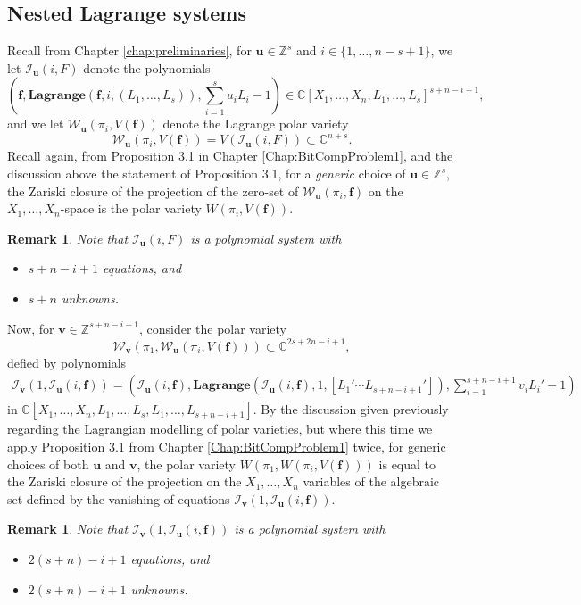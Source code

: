 \documentclass[12pt]{article}
\def\ub{{\bm u}}
\def\C{\mathbb{C}}
\def\lag{{\bm{Lagrange}}}
\newtheorem{remark}[theorem]{Remark}
\def\ub{{\bm u}}
\def\C{\mathbb{C}}
\def\Iil{\mathscr{I}_{\ub}(i,F)}
\begin{document}
\subsection{Nested Lagrange systems}\label{sec:nestedPolarVs}
Recall from Chapter \ref{chap:preliminaries}, for $\bm u \in \mathbb{Z}^s$ and $i \in \{1,\hdots,n-s+1\}$, we let $\Iil$ denote the polynomials 
\[
\left( \bm f, \lag(\bm f,i,(L_1,\hdots,L_s)), \sum_{i=1}^s u_iL_i-1\right) \in \mathbb{C}[X_1,\hdots,X_n,L_1,\hdots,L_s]^{s+n-i+1},
\]
and we let $\mathscr{W}_{\bm u}(\pi_i,V(\bm f))$ denote the Lagrange polar variety
\[
\mathscr{W}_{\bm u}(\pi_i,V(\bm f)) = V(\Iil)\subset \C^{n+s}.
\]
Recall again, from Proposition 3.1 in Chapter \ref{Chap:BitCompProblem1}, and the discussion above the statement of Proposition 3.1, for a {\em
  generic} choice of $\bm u\in \mathbb{Z}^s$, the Zariski closure of the projection of
the zero-set of $\mathscr{W}_{\bm u}(\pi_i, \bm f)$ on the $X_1,\dots,X_n$-space is the polar variety
$W(\pi_i,V(\bm f))$.
\begin{remark}
    Note that $\Iil$ is a polynomial system with
    \begin{itemize}
        \item $s+n-i+1$ equations, and
        \item $s+n$ unknowns. 
    \end{itemize}
\end{remark}
%
\noindent 
Now, for $\bm v \in \mathbb{Z}^{s+n-i+1}$, consider the polar variety \[\mathscr{W}_{\bm v}(\pi_1,\mathscr{W}_{\bm u}(\pi_i,V(\bm f))) \subset \C^{2s+2n-i+1},\]
defied by polynomials 
\begin{align*}
\mathscr{I}_{\bm v}(1,\mathscr{I}_{\bm u}(i,\bm f)) = \left(\mathscr{I}_{\bm u}(i,\bm f),\lag(\mathscr{I}_{\bm u}(i,\bm f),1,[L_1'\cdots L_{s+n-i+1}']),\sum_{i=1}^{s+n-i+1}v_iL_i' -1\right) 
\end{align*}
in 
$\C[X_1,\hdots,X_n,L_1,\hdots,L_s,L_1,\hdots,L_{s+n-i+1}]$. 
%
By the discussion given previously regarding the Lagrangian modelling of polar varieties, but where this time we apply Proposition 3.1 from Chapter \ref{Chap:BitCompProblem1} twice, for generic choices of both $\bm u$ and $\bm v$,  the polar variety $W(\pi_1,W(\pi_i,V(\bm f)))$ is equal to the Zariski closure of the projection on the $X_1,\hdots,X_n$ variables of the algebraic set defined by the vanishing of equations $\mathscr{I}_{\bm v}(1,\mathscr{I}_{\bm u}(i,\bm f)).$

%
\begin{remark}
    Note that $\mathscr{I}_{\bm v}(1,\mathscr{I}_{\bm u}(i,\bm f))$ is a polynomial system with
    \begin{itemize}
        \item $2(s+n)-i+1$ equations, and
        \item $2(s+n)-i+1$ unknowns. 
    \end{itemize}
\end{remark}
%
\end{document}
